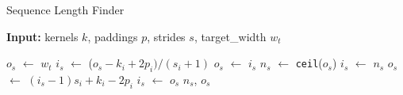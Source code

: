 \begin{algorithm}[t]
\caption{Sequence Length Finder}
\label{alg:seq-find}
\textbf{ Input:} kernels $k$, paddings $p$, strides $s$, target\_width $w_t$ 
\begin{algorithmic}[1]
    \State $o_s$ $\gets$ $w_t$ 
        \State $i_s$ $\gets$ ($o_s - k_i+2p_i)/(s_i+1)$ 
        \State $o_s$ $\gets$ $i_s$
    \EndFor
    \State $n_s$ $\gets$ \texttt{ceil}($o_s$) 
    \State $i_s$ $\gets$ $n_s$
        \State $o_s$ $\gets$ $(i_s-1)s_i + k_i - 2p_i$
        \State $i_s$ $\gets$ $o_s$
    \EndFor
    \State \Return $n_s$, $o_s$
\end{algorithmic}
\end{algorithm}
